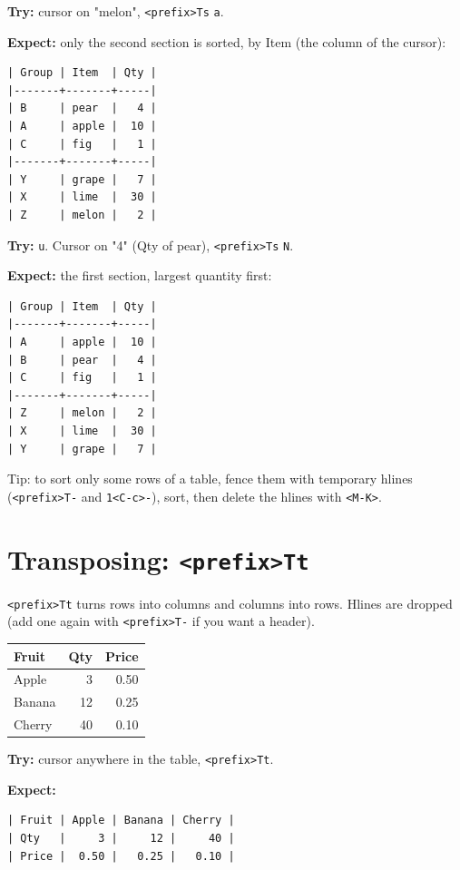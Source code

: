 \textbf{Try:} cursor on "melon", \texttt{<prefix>Ts} \texttt{a}.

\textbf{Expect:} only the second section is sorted, by Item (the column of the
cursor):
\begin{verbatim}
| Group | Item  | Qty |
|-------+-------+-----|
| B     | pear  |   4 |
| A     | apple |  10 |
| C     | fig   |   1 |
|-------+-------+-----|
| Y     | grape |   7 |
| X     | lime  |  30 |
| Z     | melon |   2 |
\end{verbatim}

\textbf{Try:} \texttt{u}. Cursor on "4" (Qty of pear), \texttt{<prefix>Ts} \texttt{N}.

\textbf{Expect:} the first section, largest quantity first:
\begin{verbatim}
| Group | Item  | Qty |
|-------+-------+-----|
| A     | apple |  10 |
| B     | pear  |   4 |
| C     | fig   |   1 |
|-------+-------+-----|
| Z     | melon |   2 |
| X     | lime  |  30 |
| Y     | grape |   7 |
\end{verbatim}

Tip: to sort only some rows of a table, fence them with temporary hlines
(\texttt{<prefix>T-} and \texttt{1<C-c>-}), sort, then delete the hlines with \texttt{<M-K>}.
\section{Transposing: \texttt{<prefix>Tt}}
\label{sec:orgbf8ef56}
\texttt{<prefix>Tt} turns rows into columns and columns into rows. Hlines are
dropped (add one again with \texttt{<prefix>T-} if you want a header).

\begin{table}[htbp]
\label{tab:org4a7a5fe}
\centering
\begin{tabular}{lrr}
Fruit & Qty & Price\\
\hline
Apple & 3 & 0.50\\
Banana & 12 & 0.25\\
Cherry & 40 & 0.10\\
\end{tabular}
\end{table}

\textbf{Try:} cursor anywhere in the table, \texttt{<prefix>Tt}.

\textbf{Expect:}
\begin{verbatim}
| Fruit | Apple | Banana | Cherry |
| Qty   |     3 |     12 |     40 |
| Price |  0.50 |   0.25 |   0.10 |
\end{verbatim}


